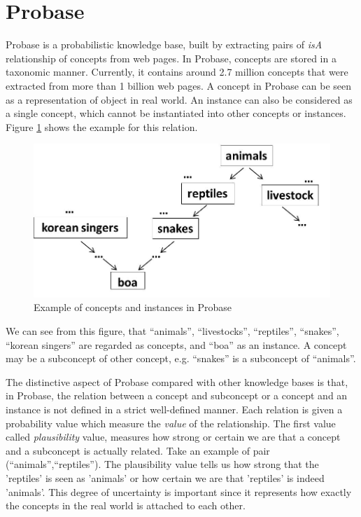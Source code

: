 \section{Probase}
Probase is a probabilistic knowledge base, built by 
extracting pairs of \textit{isA} relationship of concepts 
from web pages. In Probase, concepts are stored in a 
taxonomic manner. Currently, it contains around 2.7 
million concepts that were extracted from more than 1 
billion web pages. A concept in Probase can be seen as 
a representation of object in real world. An instance 
can also be considered as a single concept, which cannot 
be instantiated into other concepts or instances. Figure 
\ref{fig:exampleProbase} shows the example for this relation.

\begin{figure}[h]
\centering
\includegraphics[scale=0.3]{images/Figure2}
\caption{Example of concepts and instances in Probase}
\label{fig:exampleProbase}
\end{figure}

We can see from this figure, that ``animals'', ``livestocks'', 
``reptiles'', ``snakes'', ``korean singers'' are regarded as 
concepts, and ``boa'' as an instance. A concept may be a 
subconcept of other concept, e.g. ``snakes'' is a subconcept 
of ``animals''.

The distinctive aspect of Probase compared with other knowledge 
bases is that, in Probase, the relation between a concept and 
subconcept or a concept and an instance is not defined in a strict 
well-defined manner. Each relation is given a probability value 
which measure the \textit{value} of the relationship. The first 
value called \textit{plausibility} value, measures how strong or 
certain we are that a concept and a subconcept is actually related. 
Take an example of pair (``animals'',``reptiles''). The plausibility 
value tells us how strong that the 'reptiles' is seen as 'animals' or 
how certain we are that 'reptiles' is indeed 'animals'. This degree 
of uncertainty is important since it represents how exactly the 
concepts in the real world is attached to each other.

